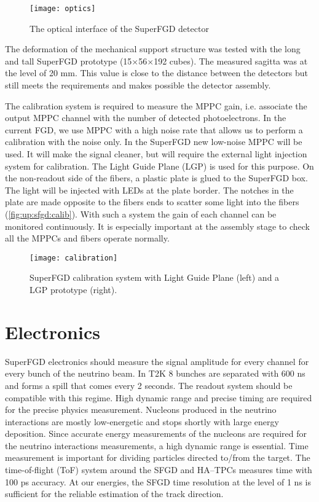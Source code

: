 \documentclass[main.tex]{subfiles}
\begin{document}
\begin{figure}[!ht]
	\centering
	\texttt{[image: optics]}
	\caption{The optical interface of the SuperFGD detector}
	\label{fig:up:sfgd:optics}
\end{figure}

The deformation of the mechanical support structure was tested with the long and tall SuperFGD prototype (15$\times$56$\times$192 cubes). The measured sagitta was at the level of 20 mm. This value is close to the distance between the detectors but still meets the requirements and makes possible the detector assembly.

The calibration system is required to measure the MPPC gain, i.e. associate the output MPPC channel with the number of detected photoelectrons. In the current FGD, we use MPPC with a high noise rate that allows us to perform a calibration with the noise only. In the SuperFGD new low-noise MPPC will be used. It will make the signal cleaner, but will require the external light injection system for calibration. The Light Guide Plane (LGP) is used for this purpose. On the non-readout side of the fibers, a plastic plate is glued to the SuperFGD box. The light will be injected with LEDs at the plate border. The notches in the plate are made opposite to the fibers ends to scatter some light into the fibers (\autoref{fig:up:sfgd:calib}). With such a system the gain of each channel can be monitored continuously. It is especially important at the assembly stage to check all the MPPCs and fibers operate normally.

\begin{figure}[!ht]
	\centering
	\texttt{[image: calibration]}
	\caption{SuperFGD calibration system with Light Guide Plane (left) and a LGP prototype (right).}
	\label{fig:up:sfgd:calib}
\end{figure}

\section{Electronics}
\label{sec:up:sfgd:ele}
SuperFGD electronics should measure the signal amplitude for every channel for every bunch of the neutrino beam. In T2K 8 bunches are separated with 600 ns and forms a spill that comes every 2 seconds. The readout system should be compatible with this regime. High dynamic range and precise timing are required for the precise physics measurement. Nucleons produced in the neutrino interactions are mostly low-energetic and stops shortly with large energy deposition. Since accurate energy measurements of the nucleons are required for the neutrino interactions measurements, a high dynamic range is essential. Time measurement is important for dividing particles directed to/from the target. The time-of-flight (ToF) system around the SFGD and HA--TPCs measures time with 100 ps accuracy. At our energies, the SFGD time resolution at the level of 1 ns is sufficient for the reliable estimation of the track direction.
\end{document}
